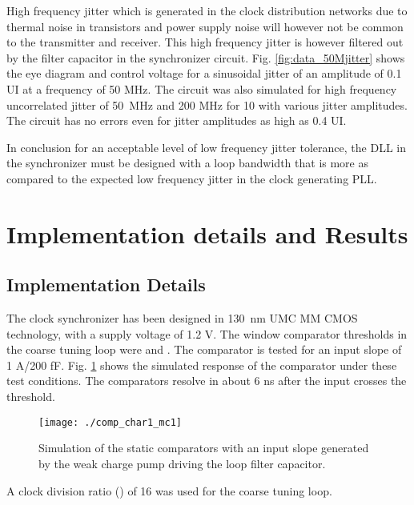 \documentclass[journal,twoside,letterpaper]{IEEEtran}
\begin{document}
High frequency jitter which is generated in the clock distribution 
networks due to thermal noise in transistors and power supply noise
will however not be common to the transmitter and receiver. 
This high frequency jitter is however filtered out by the filter
capacitor in the synchronizer circuit. Fig. \ref{fig:data_50Mjitter} shows
the eye diagram and control voltage for a sinusoidal jitter of an amplitude 
of 0.1 UI at a frequency of 50 MHz. 
The circuit was also simulated for
high frequency uncorrelated jitter of \mbox{50 MHz} and 200 MHz 
for 10  with various jitter amplitudes. 
The circuit has no errors even for jitter amplitudes 
as high as 0.4 UI.

In conclusion for an 
acceptable level of low frequency jitter tolerance, the DLL in the 
synchronizer must be designed with a loop bandwidth that is 
more as compared to the expected low frequency jitter 
in the clock generating PLL.

\section{Implementation details and Results}
\label{sec:implementation}
\subsection{Implementation Details}
The clock synchronizer has been designed in \mbox{130 nm} UMC MM CMOS technology,
with a supply voltage of 1.2 V.
The window comparator thresholds in the coarse tuning loop
were  and . The comparator is tested for an input 
slope of 1 A/200 fF.
Fig. \ref{fig:static_comp} shows the simulated response of the comparator 
under these test conditions. The comparators
resolve in about 6 ns after the input crosses the threshold.
\begin{figure}[h!]
\centering
\texttt{[image: ./comp\_char1\_mc1]}
\caption{Simulation of the static comparators with an input
slope generated by the weak charge pump driving the loop filter capacitor.}
\label{fig:static_comp}
\end{figure}
A clock division ratio () of 16 
was used for the coarse tuning loop.
\end{document}

